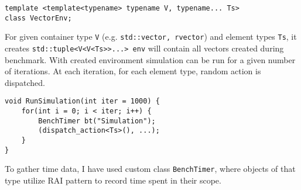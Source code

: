 \documentclass[inz, english, shortabstract]{iithesis}
\begin{document}
\begin{lstlisting}[caption=VectorEnv declaration]
template <template<typename> typename V, typename... Ts>
class VectorEnv;
\end{lstlisting}
For given container type {\tt V} (e.g. {\tt std::vector, rvector}) and element types {\tt Ts}, it creates 
{\tt std::tuple<V<V<Ts>>...> env}
will contain all vectors created during benchmark. 
With created environment simulation can be run for a given number of iterations.
At each iteration, for each element type, random action is dispatched.
\begin{lstlisting}[caption=RunSimulation]
void RunSimulation(int iter = 1000) {
	for(int i = 0; i < iter; i++) {
		BenchTimer bt("Simulation");
		(dispatch_action<Ts>(), ...);
	}
}
\end{lstlisting}
To gather time data, I have used custom class {\tt BenchTimer}, where objects of that type utilize RAI pattern to record time spent in their scope.
\end{document}
